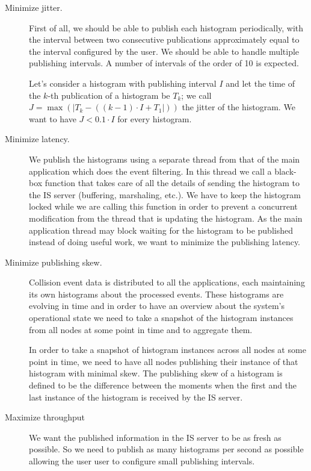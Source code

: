 \begin{description}
\item[Minimize jitter.]

First of all, we should be able to publish each histogram periodically, with the interval between two consecutive publications approximately equal to the interval configured by the user. We should be able to handle multiple publishing intervals. A number of intervals of the order of 10 is expected.

Let's consider a histogram with publishing interval $I$ and let the time of the $k$-th publication of a histogram be $T_k$; we call $J=\max(\lvert T_k-((k-1) \cdot I+T_1\rvert))$ the jitter of the histogram. We want to have $J < 0.1\cdot I$ for every histogram.

\item[Minimize latency.]

We publish the histograms using a separate thread from that of the main application which does the event filtering. In this thread we call a black-box function that takes care of all the details of sending the histogram to the IS server (buffering, marshaling, etc.). We have to keep the histogram locked while we are calling this function in order to prevent a concurrent modification from the thread that is updating the histogram. As the main application thread may block waiting for the histogram to be published instead of doing useful work, we want to minimize the publishing latency.

\item [Minimize publishing skew.]

Collision event data is distributed to all the applications, each maintaining its own histograms about the processed events. These histograms are evolving in time and in order to have an overview about the system's operational state we need to take a snapshot of the histogram instances from all nodes at some point in time and to aggregate them.

In order to take a snapshot of histogram instances across all nodes at some point in time, we need to have all nodes publishing their instance of that histogram with minimal skew. The publishing skew of a histogram is defined to be the difference between the moments when the first and the last instance of the histogram is received by the IS server.  

\item [Maximize throughput]

We want the published information in the IS server to be as fresh as possible. So we need to publish as many histograms per second as possible allowing the user user to configure small publishing intervals.


\end{description}
